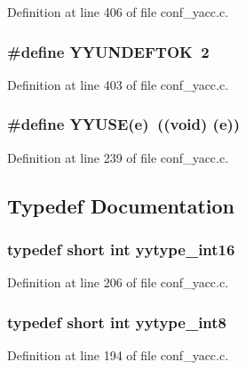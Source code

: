 Definition at line 406 of file conf\_\-yacc.c.
\subsubsection[{YYUNDEFTOK}]{\setlength{\rightskip}{0pt plus 5cm}\#define YYUNDEFTOK~2}\label{conf__yacc_8c_926181abd06b6d1df27b6133971c24ce}




Definition at line 403 of file conf\_\-yacc.c.
\subsubsection[{YYUSE}]{\setlength{\rightskip}{0pt plus 5cm}\#define YYUSE(e)~((void) (e))}\label{conf__yacc_8c_d7d1ef1bbc6adfe69894bc8221f557e1}




Definition at line 239 of file conf\_\-yacc.c.

\subsection{Typedef Documentation}
\subsubsection[{yytype\_\-int16}]{\setlength{\rightskip}{0pt plus 5cm}typedef short int {\bf yytype\_\-int16}}\label{conf__yacc_8c_de5b97f0021a4f6c5922ead3744ab297}




Definition at line 206 of file conf\_\-yacc.c.
\subsubsection[{yytype\_\-int8}]{\setlength{\rightskip}{0pt plus 5cm}typedef short int {\bf yytype\_\-int8}}\label{conf__yacc_8c_fd56a33ef7e59189deccc83706e0becd}




Definition at line 194 of file conf\_\-yacc.c.
